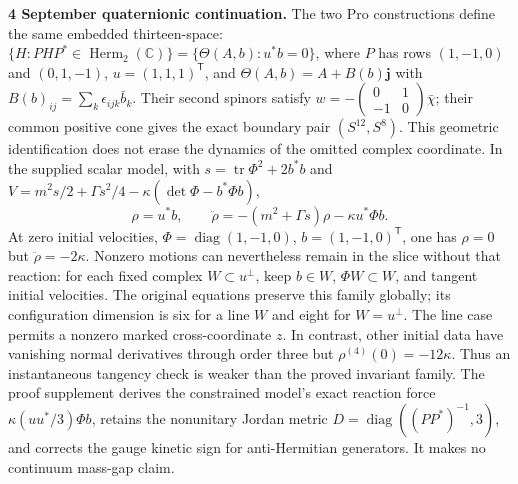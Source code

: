 \documentclass[10pt,letterpaper]{article}
\begin{document}
\noindent\textbf{4 September quaternionic continuation.}
The two Pro constructions define the same embedded thirteen-space:
$\{H:PHP^*\in\operatorname{Herm}_2(\mathbb C)\}
=\{\Theta(A,b):u^*b=0\}$, where $P$ has rows $(1,-1,0)$ and $(0,1,-1)$,
$u=(1,1,1)^{\mathsf T}$, and $\Theta(A,b)=A+B(b)\mathbf j$ with
$B(b)_{ij}=\sum_k\epsilon_{ijk}\bar b_k$. Their second spinors satisfy
$w=-\left(\begin{smallmatrix}0&1\\-1&0\end{smallmatrix}\right)\bar\chi$;
their common positive cone gives the exact boundary pair $(S^{12},S^8)$.
This geometric identification does not erase the dynamics of the omitted
complex coordinate. In the supplied scalar model, with
$s=\operatorname{tr}\Phi^2+2b^*b$ and
$V=m^2s/2+\Gamma s^2/4-\kappa(\det\Phi-b^*\Phi b)$,
\[
 \rho=u^*b,\qquad
 \ddot\rho=-(m^2+\Gamma s)\rho-\kappa u^*\Phi b.
\]
At zero initial velocities, $\Phi=\operatorname{diag}(1,-1,0)$,
$b=(1,-1,0)^{\mathsf T}$, one has $\rho=0$ but $\ddot\rho=-2\kappa$.
Nonzero motions can nevertheless remain in the slice without that reaction:
for each fixed complex $W\subset u^\perp$, keep $b\in W$,
$\Phi W\subset W$, and tangent initial velocities. The original equations
preserve this family globally; its configuration dimension is six for a
line $W$ and eight for $W=u^\perp$. The line case permits a nonzero marked
cross-coordinate $z$. In contrast, other initial data have vanishing
normal derivatives through order three but $\rho^{(4)}(0)=-12\kappa$.
Thus an instantaneous tangency check is weaker than the proved invariant
family. The proof supplement derives the constrained model's exact reaction force
$\kappa(uu^*/3)\Phi b$, retains the nonunitary Jordan metric
$D=\operatorname{diag}((PP^*)^{-1},3)$, and corrects the gauge kinetic sign
for anti-Hermitian generators. It makes no continuum mass-gap claim.
\end{document}
